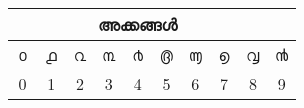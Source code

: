 \documentclass[a4paper]{article}
\makeatletter
\def\en{\color{black!80}\normalsize\En}
\def\at{\expandafter\@gobble\string\@}
\makeatother
\begin{document}
\begin{tabular}{|c|c|c|c|c|c|c|c|c|c|}

\multicolumn{9}{c}{അക്കങ്ങൾ}\\
\hline
൦ & ൧ & ൨ & ൩ & ൪ & ൫  & ൬  & ൭  & ൮ & ൯  \\
\en \at0 & \en \at1 & \en \at2 & \en \at3 & \en \at4 & \en \at5 & \en \at6 & \en \at7 & \en \at8 & \en \at9 \\
\hline
\end{tabular} 
\end{document}
